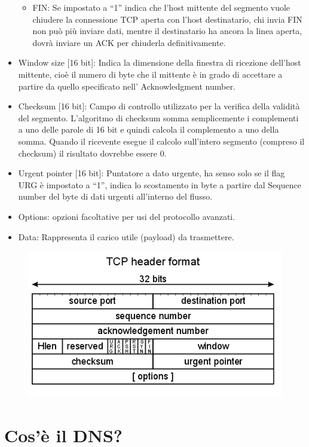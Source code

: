 \begin{itemize}
\begin{itemize}
\item	FIN: Se impostato a “1” indica che l’host mittente del segmento vuole chiudere la connessione TCP aperta con l’host destinatario, chi invia FIN non può più inviare dati, mentre il destinatario ha ancora la linea aperta, dovrà inviare un ACK per chiuderla definitivamente.
\end{itemize}
\item	Window size [16 bit]: Indica la dimensione della finestra di ricezione dell’host mittente, cioè il numero di byte che il mittente è in grado di accettare a partire da quello specificato nell’ Acknowledgment number.
\item	Checksum [16 bit]: Campo di controllo utilizzato per la verifica della validità del segmento. L’algoritmo di checksum somma semplicemente i complementi a uno delle parole di 16 bit e quindi calcola il complemento a uno della somma. Quando il ricevente esegue il calcolo sull’intero segmento (compreso il checksum) il risultato dovrebbe essere 0.
\item	Urgent pointer [16 bit]: Puntatore a dato urgente, ha senso solo se il flag URG è impostato a “1”, indica lo scostamento in byte a partire dal Sequence number del byte di dati urgenti all’interno del flusso.
\item	Options: opzioni facoltative per usi del protocollo avanzati.
\item	Data: Rappresenta il carico utile (payload) da trasmettere.
\end{itemize}

\begin{figure}[H]
\centering
\includegraphics[scale=0.7]{res/img/49_HeaderTCP.png}
\end{figure}

\section{Cos’è il DNS?}

